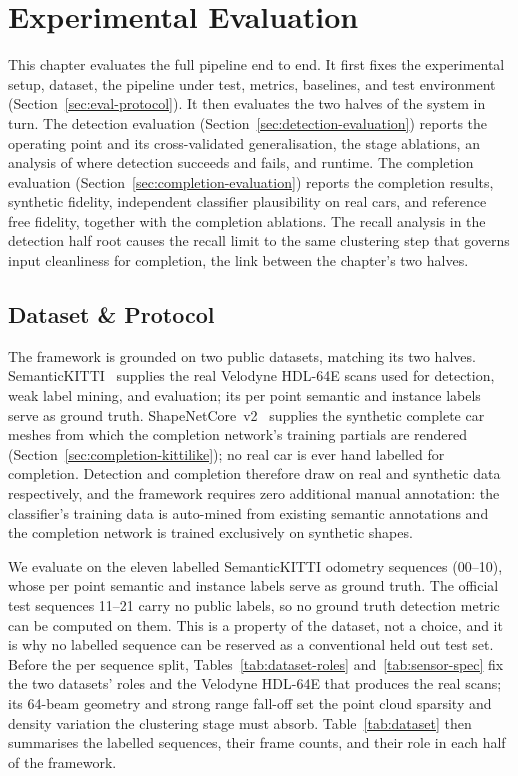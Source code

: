 \documentclass[a4paper,12pt]{report}
\begin{document}
\chapter{Experimental Evaluation}
\label{ch:evaluation}

This chapter evaluates the full pipeline end to end. It first fixes the
experimental setup, dataset, the pipeline under test, metrics, baselines, and
test environment (Section~\ref{sec:eval-protocol}). It then evaluates the two
halves of the system in turn. The detection evaluation
(Section~\ref{sec:detection-evaluation}) reports the operating point and its
cross-validated generalisation, the stage ablations, an analysis of where
detection succeeds and fails, and runtime. The completion evaluation
(Section~\ref{sec:completion-evaluation}) reports the completion results,
synthetic fidelity, independent classifier plausibility on real cars, and
reference free fidelity, together with the completion ablations. The recall
analysis in the detection half root causes the recall limit to the same
clustering step that governs input cleanliness for completion, the link between
the chapter's two halves.

\section{Dataset \& Protocol}
\label{sec:eval-sequences}

The framework is grounded on two public datasets, matching its two halves.
SemanticKITTI~\cite{Behley_2019_ICCV} supplies the real Velodyne HDL-64E scans
used for detection, weak label mining, and evaluation; its per point semantic and instance
labels serve as ground truth. ShapeNetCore~v2~\cite{chang2015shapenetinformationrich3dmodel}
supplies the synthetic complete car meshes from which the completion network's training
partials are rendered (Section~\ref{sec:completion-kittilike}); no real car is ever
hand labelled for completion. Detection and completion therefore draw on real and
synthetic data respectively, and the framework requires zero additional manual
annotation: the classifier's training data is auto-mined from existing semantic
annotations and the completion network is trained exclusively on synthetic shapes.

We evaluate on the eleven labelled SemanticKITTI odometry sequences
(\numrange{00}{10}), whose per point semantic and instance labels serve as
ground truth. The official test sequences \numrange{11}{21} carry no
public labels, so no ground truth detection metric can be computed on them. This
is a property of the dataset, not a choice, and it is why no labelled sequence
can be reserved as a conventional held out test set. Before the per sequence split,
Tables~\ref{tab:dataset-roles} and~\ref{tab:sensor-spec} fix the two datasets' roles and
the Velodyne HDL-64E that produces the real scans; its \num{64}-beam geometry and strong
range fall-off set the point cloud sparsity and density variation the clustering stage must
absorb. Table~\ref{tab:dataset} then summarises the labelled sequences, their frame counts,
and their role in each half of the framework.
\end{document}
